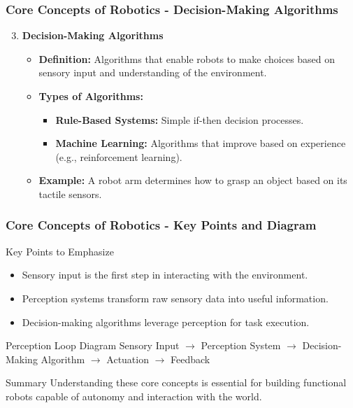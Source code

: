 \documentclass{beamer}
\begin{document}
\begin{frame}[fragile]
    \frametitle{Core Concepts of Robotics - Decision-Making Algorithms}

    \begin{enumerate}
        \setcounter{enumi}{2}
        \item \textbf{Decision-Making Algorithms}
        \begin{itemize}
            \item \textbf{Definition:} Algorithms that enable robots to make choices based on sensory input and understanding of the environment.
            \item \textbf{Types of Algorithms:}
              \begin{itemize}
                  \item \textbf{Rule-Based Systems:} Simple if-then decision processes.
                  \item \textbf{Machine Learning:} Algorithms that improve based on experience (e.g., reinforcement learning).
              \end{itemize}
            \item \textbf{Example:} A robot arm determines how to grasp an object based on its tactile sensors.
        \end{itemize}
    \end{enumerate}
\end{frame}

\begin{frame}[fragile]
    \frametitle{Core Concepts of Robotics - Key Points and Diagram}

    \begin{block}{Key Points to Emphasize}
        \begin{itemize}
            \item Sensory input is the first step in interacting with the environment.
            \item Perception systems transform raw sensory data into useful information.
            \item Decision-making algorithms leverage perception for task execution.
        \end{itemize}
    \end{block}

    \begin{block}{Perception Loop Diagram}
        \centering
        Sensory Input $\rightarrow$ Perception System $\rightarrow$ Decision-Making Algorithm $\rightarrow$ Actuation $\rightarrow$ Feedback
    \end{block}

    \begin{block}{Summary}
        Understanding these core concepts is essential for building functional robots capable of autonomy and interaction with the world.
    \end{block}
\end{frame}
\end{document}
